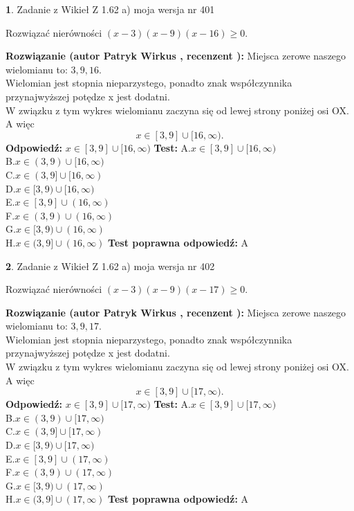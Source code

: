 \documentclass[12pt, a4paper]{article}
\theoremstyle{definition} %
\newtheorem{zad}{}
\newcommand{\zadStart}[1]{\begin{zad}#1\newline}
\newcommand{\zadStop}{\end{zad}}
\newcommand{\rozwStart}[2]{\noindent \textbf{Rozwiązanie (autor #1 , recenzent #2): }\newline}
\newcommand{\rozwStop}{\newline}
\newcommand{\odpStart}{\noindent \textbf{Odpowiedź:}\newline}
\newcommand{\odpStop}{\newline}
\newcommand{\testStart}{\noindent \textbf{Test:}\newline}
\newcommand{\testStop}{\newline}
\newcommand{\kluczStart}{\noindent \textbf{Test poprawna odpowiedź:}\newline}
\newcommand{\kluczStop}{\newline}
\begin{document}
\zadStart{Zadanie z Wikieł Z 1.62 a) moja wersja nr 401}

Rozwiązać nierówności $(x-3)(x-9)(x-16)\ge0$.
\zadStop
\rozwStart{Patryk Wirkus}{}
Miejsca zerowe naszego wielomianu to: $3, 9, 16$.\\
Wielomian jest stopnia nieparzystego, ponadto znak współczynnika przy\linebreak najwyższej potędze x jest dodatni.\\ W związku z tym wykres wielomianu zaczyna się od lewej strony poniżej osi OX. A więc $$x \in [3,9] \cup [16,\infty).$$
\rozwStop
\odpStart
$x \in [3,9] \cup [16,\infty)$
\odpStop
\testStart
A.$x \in [3,9] \cup [16,\infty)$\\
B.$x \in (3,9) \cup [16,\infty)$\\
C.$x \in (3,9] \cup [16,\infty)$\\
D.$x \in [3,9) \cup [16,\infty)$\\
E.$x \in [3,9] \cup (16,\infty)$\\
F.$x \in (3,9) \cup (16,\infty)$\\
G.$x \in [3,9) \cup (16,\infty)$\\
H.$x \in (3,9] \cup (16,\infty)$
\testStop
\kluczStart
A
\kluczStop



\zadStart{Zadanie z Wikieł Z 1.62 a) moja wersja nr 402}

Rozwiązać nierówności $(x-3)(x-9)(x-17)\ge0$.
\zadStop
\rozwStart{Patryk Wirkus}{}
Miejsca zerowe naszego wielomianu to: $3, 9, 17$.\\
Wielomian jest stopnia nieparzystego, ponadto znak współczynnika przy\linebreak najwyższej potędze x jest dodatni.\\ W związku z tym wykres wielomianu zaczyna się od lewej strony poniżej osi OX. A więc $$x \in [3,9] \cup [17,\infty).$$
\rozwStop
\odpStart
$x \in [3,9] \cup [17,\infty)$
\odpStop
\testStart
A.$x \in [3,9] \cup [17,\infty)$\\
B.$x \in (3,9) \cup [17,\infty)$\\
C.$x \in (3,9] \cup [17,\infty)$\\
D.$x \in [3,9) \cup [17,\infty)$\\
E.$x \in [3,9] \cup (17,\infty)$\\
F.$x \in (3,9) \cup (17,\infty)$\\
G.$x \in [3,9) \cup (17,\infty)$\\
H.$x \in (3,9] \cup (17,\infty)$
\testStop
\kluczStart
A
\kluczStop
\end{document}

